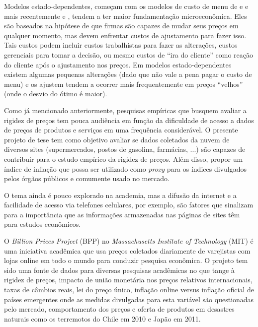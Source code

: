 \documentclass[twoside,a4paper,11pt]{report}
\begin{document}
Modelos estado-dependentes, começam com os modelos de custo de menu de \citet{barro1972theory} e \citet{sheshinski1977inflation} e mais recentemente \citet{dotsey1999state} e \citet{golosov2007menu}, tendem a ter maior fundamentação microeconômica. Eles são baseados na hipótese de que firmas são capazes de mudar seus preços em qualquer momento, mas devem enfrentar custos de ajustamento para fazer isso. Tais custos podem incluir custos trabalhistas para fazer as alterações, custos gerenciais para tomar a decisão, ou mesmo custos de “ira do cliente” como reação do cliente após o ajustamento nos preços. Em modelos estado-dependentes existem algumas pequenas alterações (dado que não vale a pena pagar o custo de menu) e os ajustem tendem a ocorrer mais frequentemente em preços “velhos” (onde o desvio do ótimo é maior).

Como já mencionado anteriormente, pesquisas empíricas que busquem avaliar a rigidez de preços tem pouca audiência em função da dificuldade de acesso a dados de preços de produtos e serviços em uma frequência considerável. O presente projeto de tese tem como objetivo avaliar se dados coletados da nuvem de diversos sites (supermercados, postos de gasolina, farmácias, ...) são capazes de contribuir para o estudo empírico da rigidez de preços. Além disso, propor um índice de inflação que possa ser utilizado como \emph{proxy} para os índices divulgados pelos órgãos públicos e comumente usado no mercado.  

O tema ainda é pouco explorado na academia, mas a difusão da internet e a facilidade de acesso via telefones celulares, por exemplo, são fatores que sinalizam para a importância que as informações armazenadas nas páginas de sites têm para estudos econômicos. 

O \emph{Billion Prices Project} (BPP) no \emph{Massachusetts Institute of Technology} (MIT) é uma iniciativa acadêmica que usa preços coletados diariamente de varejistas com lojas online em todo o mundo para conduzir pesquisa econômica. O projeto tem sido uma fonte de dados para diversas pesquisas acadêmicas no que tange à rigidez de preços, impacto de união monetária nos preços relativos internacionais, taxas de câmbios reais, lei do preço único, inflação online versus inflação oficial de países emergentes onde as medidas divulgadas para esta variável são questionadas pelo mercado, comportamento dos preços e oferta de produtos em desastres naturais como os terremotos do Chile em 2010 e Japão em 2011.
\end{document}
